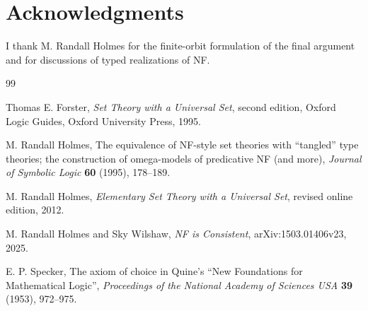 \documentclass[11pt]{article}
\numberwithin{equation}{section}
\theoremstyle{definition}
\theoremstyle{remark}
\begin{document}
\section*{Acknowledgments}
I thank M. Randall Holmes for the finite-orbit formulation of the final
argument and for discussions of typed realizations of NF.

\begin{thebibliography}{99}

Thomas E. Forster,
\emph{Set Theory with a Universal Set}, second edition,
Oxford Logic Guides, Oxford University Press, 1995.

M. Randall Holmes,
The equivalence of NF-style set theories with ``tangled'' type theories;
the construction of omega-models of predicative NF (and more),
\emph{Journal of Symbolic Logic} \textbf{60} (1995), 178--189.

M. Randall Holmes,
\emph{Elementary Set Theory with a Universal Set},
revised online edition, 2012.

M. Randall Holmes and Sky Wilshaw,
\emph{NF is Consistent}, arXiv:1503.01406v23, 2025.

E. P. Specker,
The axiom of choice in Quine's ``New Foundations for Mathematical Logic'',
\emph{Proceedings of the National Academy of Sciences USA}
\textbf{39} (1953), 972--975.

\end{thebibliography}
\end{document}
